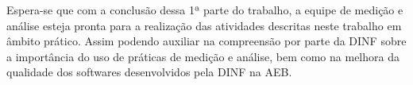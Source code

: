 Espera-se que com a conclusão dessa 1ª parte do trabalho, a equipe de medição e análise esteja pronta para a realização das atividades descritas neste trabalho em âmbito prático. Assim podendo auxiliar na compreensão por parte da DINF sobre a importância do uso de práticas de medição e análise, bem como na melhora da qualidade dos softwares desenvolvidos pela DINF na AEB.
